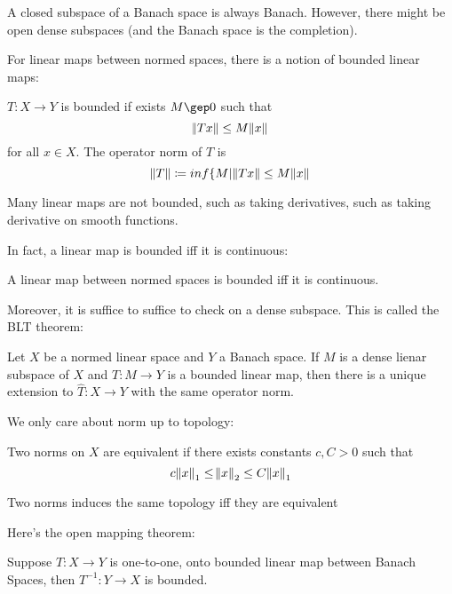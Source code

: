 \documentclass[main.tex]{subfiles}
\begin{document}
A closed subspace of a Banach space is always Banach. However, there might be open dense subspaces (and the Banach space is the completion).

For linear maps between normed spaces, there is a notion of bounded linear maps:

\begin{definition}
$T: X \rightarrow Y$ is bounded if exists $M \gep 0$ such that 
$$
\norm{Tx} \leq M \norm{x}
$$
for all $x \in X$. The operator norm of $T$ is 
$$
\norm{T} \coloneqq inf \{ M | \norm{Tx} \leq M \norm{x}
$$
\end{definition}

Many linear maps are not bounded, such as taking derivatives, such as taking derivative on smooth functions. 

In fact, a linear map is bounded iff it is continuous:

\begin{theorem}
A linear map between normed spaces is bounded iff it is continuous.
\end{theorem}

Moreover, it is suffice to suffice to check on a dense subspace. This is called the BLT theorem:

\begin{theorem}
Let $X$ be a normed linear space and $Y$ a Banach space. If $M$ is a dense lienar subspace of $X$ and $T: M \rightarrow Y$ is a bounded linear map, then there is a unique extension to $\hat{T}: X \rightarrow Y$ with the same operator norm.
\end{theorem}

We only care about norm up to topology:

\begin{definition}
Two norms on $X$ are equivalent if there exists constants $c , C > 0$ such that 
$$
c\norm{x}_1 \leq \norm{x}_2 \leq C\norm{x}_1
$$
\end{definition}

\begin{theorem}
Two norms induces the same topology iff they are equivalent
\end{theorem}

Here's the open mapping theorem:

\begin{theorem}
Suppose $T: X \rightarrow Y$ is one-to-one, onto bounded linear map between Banach Spaces, then $T^{-1} : Y \rightarrow X$ is bounded.
\end{theorem}
\end{document}

